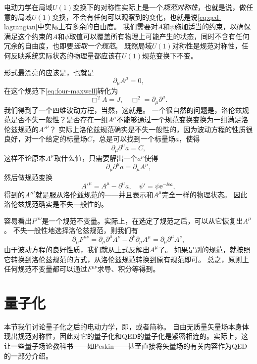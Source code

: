 电动力学在局域$U(1)$变换下的对称性实际上是一个\emph{规范对称性}，也就是说，做任意的局域$U(1)$变换，不会有任何可以观察到的变化，也就是说\eqref{eq:qed-lagrangian}中实际上有多余的自由度。
我们需要对$A$和$\psi$施加适当的约束，以确保满足这个约束的$A$和$\psi$取值可以覆盖所有物理上可能产生的状态，同时不含有任何冗余的自由度，也即要\emph{选取一个规范}。
既然局域$U(1)$对称性是规范对称性，任何反映系统实际状态的物理量都应该在$U(1)$规范变换下不变。

形式最漂亮的应该是，也就是
\begin{equation}
    \partial_\mu A^\mu = 0,
\end{equation}
在这个规范下\eqref{eq:four-maxwell}转化为
\begin{equation}
    \Box^2 A = J, \quad \Box^2 = \partial_\mu \partial^\mu.
\end{equation}
我们得到了一个四维波动方程，当然，这就是。
一个很自然的问题是，洛伦兹规范是否不失一般性？是否存在一组$A^\mu$不能够通过一个规范变换变换为一组满足洛伦兹规范的$A'^\mu$？
实际上洛伦兹规范确实是不失一般性的，因为波动方程的性质很良好，对一个给定的标量场$C$，总是可以找到一个标量场$a$，使得
\[
    \partial_\mu \partial^\mu a = C,
\]
这样不论原本$A^\mu$取什么值，只需要解出一个$a^\mu$使得
\[
    \partial_\mu \partial^\mu a = \partial_\mu A^\mu,
\]
然后做规范变换
\[
    A'^\mu = A^\mu - \partial^\mu a, \quad \psi' = \psi \ee^{-\ii e a},
\]
得到的$A'^\mu$就是服从洛伦兹规范的——并且表示和$A^\mu$完全一样的物理状态。
因此洛伦兹规范确实是不失一般性的。

容易看出$F^{\mu \nu}$是一个规范不变量。实际上，在选定了规范之后，可以从它恢复出$A^\mu$。
不失一般性地选择洛伦兹规范，则我们有
\[
    \partial_\mu F^{\mu \nu} = \partial_\mu \partial^\mu A^\nu - \partial^\nu \partial_\mu A^\mu = \partial_\mu \partial^\mu A^\nu,
\]
由于波动方程的良好性质，我们就从上式反解出$A^\mu$了。
如果是别的规范，就按照它转换到洛伦兹规范的方式，从洛伦兹规范转换到原有规范即可。
总之，原则上任何规范不变量都可以通过$F^{\mu \nu}$求导、积分等得到。

\section{量子化}

本节我们讨论量子化之后的电动力学，即，或者简称。
自由无质量矢量场本身体现出规范对称性，因此对它的量子化和QED的量子化是紧密相连的。实际上，这让一些量子场论教科书——如Peskin——甚至直接将矢量场的有关内容作为QED的一部分介绍。

